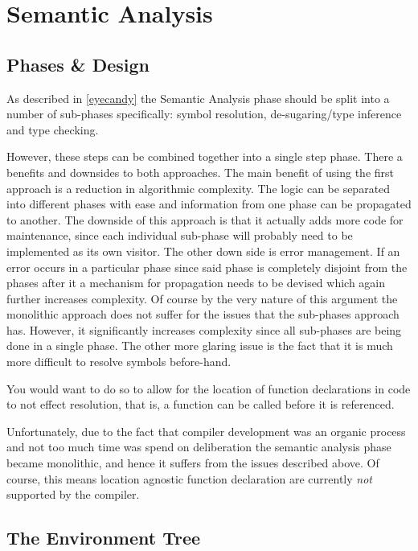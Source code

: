 \section{Semantic Analysis}

\subsection{Phases \& Design}

As described in \ref{eyecandy} the Semantic Analysis phase
should be split into a number of sub-phases specifically: symbol
resolution, de-sugaring/type inference and type checking.

However, these steps can be combined together into a single step
phase. There a benefits and downsides to both approaches. The
main benefit of using the first approach is a reduction in
algorithmic complexity. The logic can be separated into
different phases with ease and information from one phase can be
propagated to another. The downside of this approach is that it
actually adds more code for maintenance, since each individual
sub-phase will probably need to be implemented as its own
visitor. The other down side is error management. If an error
occurs in a particular phase since said phase is completely
disjoint from the phases after it a mechanism for propagation
needs to be devised which again further increases complexity. Of
course by the very nature of this argument the monolithic
approach does not suffer for the issues that the sub-phases
approach has. However, it significantly increases complexity
since all sub-phases are being done in a single phase. The other
more glaring issue is the fact that it is much more difficult to
resolve symbols before-hand.

You would want to do so to allow for the location of function
declarations in code to not effect resolution, that is, a
function can be called before it is referenced.

Unfortunately, due to the fact that compiler development was an
organic process and not too much time was spend on deliberation
the semantic analysis phase became monolithic, and hence it
suffers from the issues described above. Of course, this means
location agnostic function declaration are currently \emph{not}
supported by the compiler.

\subsection{The Environment Tree}

